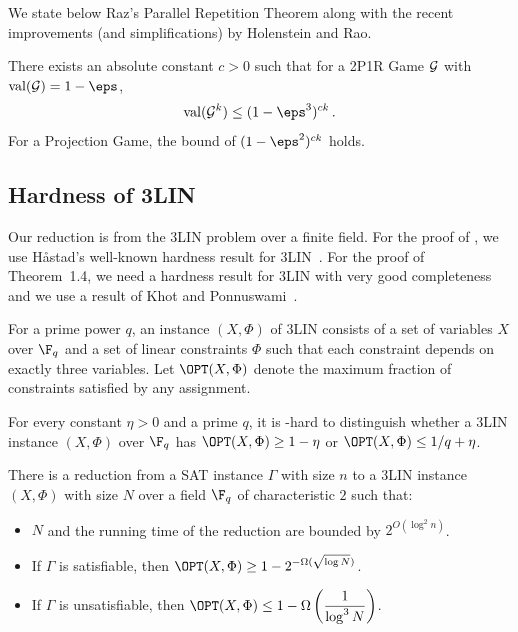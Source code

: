 We state below Raz's Parallel Repetition Theorem along with the recent
improvements (and simplifications) by Holenstein and Rao.
\begin{theorem}\label{thm:pr} 
There exists an absolute constant $c > 0$ such that for a 2P1R
Game ${\cal G}$ with ${\rm val}({\cal G})= 1-\eps$,
 $$ {\rm val}({\cal G}^k) \leq (1-\eps^{3})^{c k}\,. $$
For a Projection Game, the bound of $(1-\eps^{2})^{c k}$ holds.
\end{theorem}

\subsection{Hardness of 3LIN}

Our reduction is from the 3LIN problem over a finite field. For the proof of , we use H\aa stad's well-known hardness result for 3LIN~\cite{Has97}.
For the proof of Theorem~1.4, we need a hardness result for
3LIN with very good completeness and we use a result of Khot and Ponnuswami~\cite{KhotPonnuswami}.

\begin{definition} For a prime power $q$,
an instance $(X, \Phi)$ of 3LIN consists of a set of variables $X$
over $\F_q$ and a set of linear constraints $\Phi$ such that each
constraint depends on exactly three variables. Let $\OPT(X,
\Phi)$ denote the maximum fraction of constraints satisfied by any
assignment.
\end{definition}

\begin{theorem}\label{thm:Has97} 
For every constant $\eta > 0$ and a prime $q$, it is
-hard to distinguish whether a 3LIN instance $(X, \Phi)$ over
$\F_q$ has $\OPT(X,\Phi) \geq 1-\eta$ or $\OPT(X,\Phi)
\leq {1}/{q}+\eta$.
\end{theorem}

\begin{theorem}\label{thm:kp} 
There is a reduction from a SAT instance $\Gamma$
with size $n$ to a 3LIN instance $(X,\Phi)$ with size $N$ over a field $\F_q$ of characteristic $2$
such that: \begin{itemize}
\item $N$ and the running time of the reduction are bounded by $2^{O(\log^2 n)}$.
\item If $\Gamma$ is satisfiable, then $\displaystyle\OPT(X, \Phi) \geq
1- 2^{-\Omega(\sqrt{\log N})}$.
\item If $\Gamma$ is unsatisfiable, then $\displaystyle\OPT(X, \Phi) \leq
1- \Omega\left( \frac{1}{\log^3 N}  \right)$.
\end{itemize}
\end{theorem}

